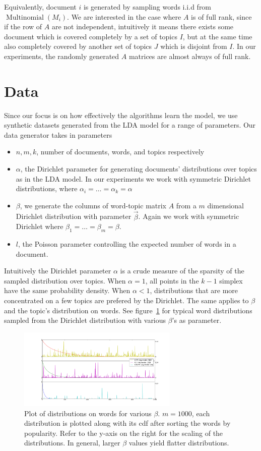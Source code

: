 \documentclass{sig-alternate}
\begin{document}
Equivalently, document $i$ is generated by sampling words i.i.d from
$\operatorname{Multinomial}(M_i)$. We are interested in the case where $A$ is of full
rank, since if the row of $A$ are not independent, intuitively it
means there exists some document which is covered completely by a set
of topics $I$, but at the same time also completely covered by another
set of topics $J$ which is disjoint from $I$. In our experiments, the
randomly generated $A$ matrices are almost always of full rank.

\section{Data} \label{sec:data}

Since our focus is on how effectively the algorithms learn the model,
we use synthetic datasets generated from the LDA model for a range of
parameters. Our data generator takes in parameters
\begin{itemize}
	\item $n,m,k$, number of documents, words, and topics respectively
	\item $\alpha$, the Dirichlet parameter for generating documents' distributions over topics as in the LDA model. In our experiments we work with symmetric Dirichlet distributions, where $\alpha_i=\ldots=\alpha_k=\alpha$
	\item $\beta$, we generate the columns of word-topic matrix $A$ from a $m$ dimensional Dirichlet distribution with parameter $\vec{\beta}$. Again we work with symmetric Dirichlet where $\beta_1=\ldots=\beta_m=\beta$. 
	\item $l$, the Poisson parameter controlling the expected number of words in a document.
\end{itemize}
Intuitively the Dirichlet parameter $\alpha$ is a crude measure of the
sparsity of the sampled distribution over topics. When $\alpha=1$, all
points in the $k-1$ simplex have the same probability density. When
$\alpha<1$, distributions that are more concentrated on a few topics
are prefered by the Dirichlet. The same applies to $\beta$ and the
topic's distribution on words. See figure~\ref{fig:beta_plots} for
typical word distributions sampled from the Dirichlet distribution
with various $\beta$'s as parameter.  \setlength\tabcolsep{0.5pt}
\begin{figure}
	\includegraphics[width=3in]{beta_plots.pdf}
	\caption{Plot of distributions on words for various $\beta$. $m=1000$, each distribution is plotted along with its cdf after sorting the words by popularity. Refer to the y-axis on the right for the scaling of the distributions. In general, larger $\beta$ values yield flatter distributions.}
	\label{fig:beta_plots}
\end{figure} 
\setlength\tabcolsep{6pt}
\end{document}
